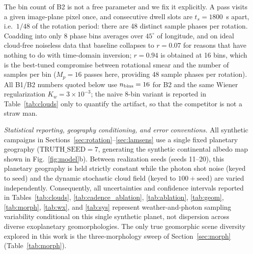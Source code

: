 \documentclass[twocolumn,10pt]{article}
\begin{document}
The bin count of B2 is not a free parameter and we fix it explicitly.
A pass visits a given image-plane pixel once, and consecutive dwell slots are
$t_s=1800$~s apart, i.e.\ $1/48$ of the rotation period: there are 48 distinct
sample phases per rotation. Coadding into only 8 phase bins averages over
$45^\circ$ of longitude, and on ideal cloud-free noiseless data that baseline
collapses to $r=0.07$ for reasons that have nothing to do with time-domain
inversion; $r=0.94$ is obtained at 16 bins, which is the best-tuned compromise
between rotational smear and the number of samples per bin ($M_p=16$ passes here, providing 48 sample phases per rotation). All B1/B2 numbers quoted below use $n_{\rm bins}=16$ for B2 and the
same Wiener regularization $K_w=3\times10^{-3}$; the naive 8-bin variant is
reported in Table~\ref{tab:clouds} only to quantify the artifact, so that the
competitor is not a straw man.

\emph{Statistical reporting, geography conditioning, and error conventions.}
All synthetic campaigns in Sections~\ref{sec:rotation}--\ref{sec:lamsens} use a single fixed planetary geography ($\mathrm{TRUTH\_SEED}=7$, generating the synthetic continental albedo map shown in Fig.~\ref{fig:model}b). Between realization seeds (seeds 11--20), this planetary geography is held strictly constant while the photon shot noise (keyed to $\mathrm{seed}$) and the dynamic stochastic cloud field (keyed to $100+\mathrm{seed}$) are varied independently. Consequently, all uncertainties and confidence intervals reported in Tables~\ref{tab:clouds}, \ref{tab:cadence_ablation}, \ref{tab:ablation}, \ref{tab:geom}, \ref{tab:morph}, \ref{tab:wx}, and \ref{tab:sys} represent weather-and-photon sampling variability conditional on this single synthetic planet, not dispersion across diverse exoplanetary geomorphologies. The only true geomorphic scene diversity explored in this work is the three-morphology sweep of Section~\ref{sec:morph} (Table~\ref{tab:morph}).
\end{document}
